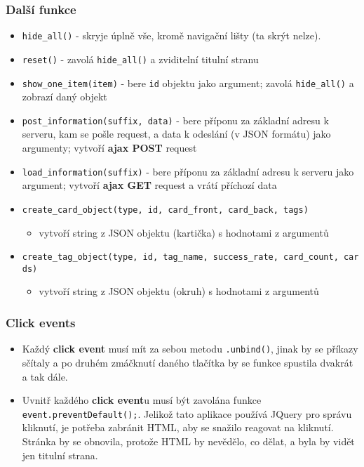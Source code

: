 \documentclass[11pt]{article}
\providecommand{\tightlist}{\setlength{\itemsep}{1pt}\setlength{\parskip}{1pt}}
\let\oldtexttt\texttt
\renewcommand{\texttt}[1]{\oldtexttt{\textcolor{codehighlight}{#1}}}
\begin{document}
\hypertarget{dalux161uxed-funkce}{%
\subsubsection{Další funkce}\label{dalux161uxed-funkce}}

\begin{itemize}
\tightlist
\item
  \texttt{hide\_all()} - skryje úplně vše, kromě navigační lišty (ta
  skrýt nelze).
\item
  \texttt{reset()} - zavolá \texttt{hide\_all()} a zviditelní titulní
  stranu
\item
  \texttt{show\_one\_item(item)} - bere \texttt{id} objektu jako
  argument; zavolá \texttt{hide\_all()} a zobrazí daný objekt
\item
  \texttt{post\_information(suffix,\ data)} - bere příponu za základní
  adresu k serveru, kam se pošle request, a data k odeslání (v JSON
  formátu) jako argumenty; vytvoří \textbf{ajax POST} request
\item
  \texttt{load\_information(suffix)} - bere příponu za základní adresu k
  serveru jako argument; vytvoří \textbf{ajax GET} request a vrátí
  příchozí data
\item
  \texttt{create\_card\_object(type,\ id,\ card\_front,\ card\_back,\ tags)}

  \begin{itemize}
  \tightlist
  \item
    vytvoří string z JSON objektu (kartička) s hodnotami z argumentů
  \end{itemize}
\item
  \texttt{create\_tag\_object(type,\ id,\ tag\_name,\ success\_rate,\ card\_count,\ cards)}

  \begin{itemize}
  \tightlist
  \item
    vytvoří string z JSON objektu (okruh) s hodnotami z argumentů
  \end{itemize}
\end{itemize}

\hypertarget{click-events}{%
\subsubsection{Click events}\label{click-events}}

\begin{itemize}
\tightlist
\item
  Každý \textbf{click event} musí mít za sebou metodu
  \texttt{.unbind()}, jinak by se příkazy sčítaly a po druhém zmáčknutí
  daného tlačítka by se funkce spustila dvakrát a tak dále.
\item
  Uvnitř každého \textbf{click event}u musí být zavolána funkce
  \texttt{event.preventDefault();}. Jelikož tato aplikace používá JQuery
  pro správu kliknutí, je potřeba zabránit HTML, aby se snažilo reagovat
  na kliknutí. Stránka by se obnovila, protože HTML by nevědělo, co
  dělat, a byla by vidět jen titulní strana.
\end{itemize}
\end{document}
